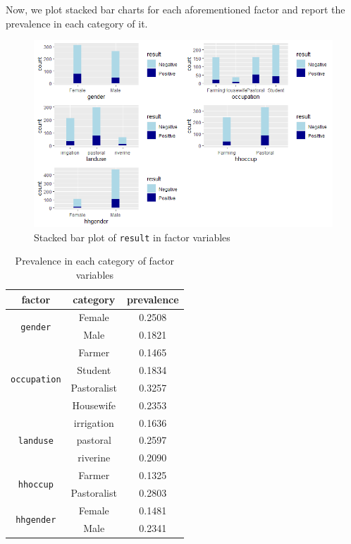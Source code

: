 \documentclass[11pt,twoside]{article}
\numberwithin{Theorem}{section}
\numberwithin{Definition}{section}
\numberwithin{Lemma}{section}
\numberwithin{Algorithm}{section}
\numberwithin{equation}{section}
\begin{document}
Now, we plot stacked bar charts for each aforementioned factor and report the prevalence in each category of it. 

\begin{figure}[!h]
	\centering
	\includegraphics[width = \textwidth]{Images/factors.png}
	\caption{Stacked bar plot of \texttt{result} in factor variables}
	\label{fig:factor}
\end{figure}

\begin{table}
	\centering
	\begin{tabular}{|c|c|c|}
		\hline
		factor & category & prevalence \\
		\hline
		\multirow{2}{*}{\texttt{gender}} & Female & 0.2508 \\
		 & Male & 0.1821 \\
		\hline
		\multirow{4}{*}{\texttt{occupation}} & Farmer & 0.1465 \\
		 & Student & 0.1834 \\			
		 & Pastoralist & 0.3257 \\			
		 & Housewife & 0.2353 \\
		\hline
		\multirow{3}{*}{\texttt{landuse}} & irrigation & 0.1636 \\
		 & pastoral & 0.2597 \\
		 & riverine & 0.2090 \\
		\hline
		\multirow{2}{*}{\texttt{hhoccup}} & Farmer & 0.1325 \\
		 & Pastoralist & 0.2803 \\
		\hline
		\multirow{2}{*}{\texttt{hhgender}} & Female & 0.1481 \\
		 & Male & 0.2341 \\
		\hline
	\end{tabular}
	\caption{Prevalence in each category of factor variables}
	\label{tab:factor}
\end{table}
\end{document}
